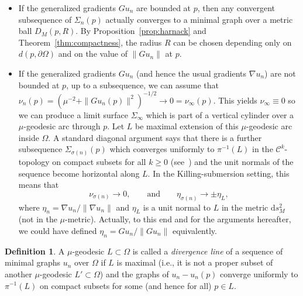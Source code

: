 \documentclass[a4paper,10pt,reqno]{amsart}
\newcommand{\df}{\mathrm{d}}
\theoremstyle{definition}
\newtheorem{definition}[theorem]{Definition}
\theoremstyle{remark}
\numberwithin{equation}{section}
\begin{document}
\begin{itemize}
	\item If the generalized gradients $Gu_n$ are bounded at $p$, then any convergent subsequence of $\Sigma_n(p)$ actually converges to a minimal graph over a metric ball $D_M(p,R)$. By Proposition~\ref{prop:harnack} and Theorem~\ref{thm:compactness}, the radius $R$ can be chosen depending only on $d(p,\partial\Omega)$ and on the value of $\|Gu_n\|$ at $p$.

	\item If the generalized gradients $Gu_n$ (and hence the usual gradients $\nabla u_n$) are not bounded at $p$, up to a subsequence, we can assume that $\nu_n(p)=(\mu^{-2}+\|Gu_n(p)\|^2)^{-1/2}\to 0=\nu_\infty(p)$. This yields $\nu_\infty\equiv 0$ so we can produce a limit surface $\Sigma_\infty$ which is part of a vertical cylinder over a $\mu$-geodesic arc through $p$. Let $L$ be maximal extension of this $\mu$-geodesic arc inside $\Omega$. A standard diagonal argument says that there is a further subsequence $\Sigma_{\sigma(n)}(p)$ which converges uniformly to $\pi^{-1}(L)$ in the $\mathcal C^k$-topology on compact subsets for all $k\geq 0$ (see~\cite[Lemma~4.3]{MRR}) and the unit normals of the sequence become horizontal along $L$. In the Killing-submersion setting, this means that
	\begin{equation}\label{eqn:divergence-line-normal}
	\nu_{\sigma(n)}\longrightarrow 0,\qquad\text{and}\qquad \eta_{\sigma(n)}\longrightarrow\pm\eta_L,
	\end{equation}
	where $\eta_n={\nabla u_n}/{\|\nabla u_n\|}$ and $\eta_L$ is a unit normal to $L$ in the metric $\df s^2_M$ (not in the $\mu$-metric). Actually, to this end and for the arguments hereafter, we could have defined $\eta_n=Gu_n/\|Gu_n\|$ equivalently. 
\end{itemize}

\begin{definition}\label{defi:divergence-line}
A $\mu$-geodesic $L\subset\Omega$ is called a \emph{divergence line} of a sequence of minimal graphs $u_n$ over $\Omega$ if $L$ is maximal (i.e., it is not a proper subset of another $\mu$-geodesic $L'\subset\Omega$) and the graphs of $u_n-u_n(p)$ converge uniformly to $\pi^{-1}(L)$ on compact subsets for some (and hence for all) $p\in L$.
\end{definition}
\end{document}
